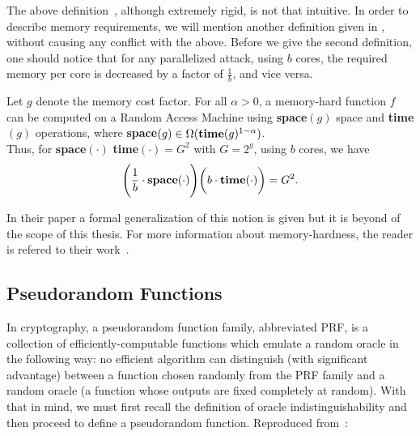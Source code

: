 The above definition~\cite{cryptoeprint:2016:875}, although extremely rigid, is not that intuitive. In order to describe memory requirements, we will mention another definition given in \cite{ForlerLW13}, without causing any conflict with the above. Before we give the second definition, one should notice that for any parallelized attack, using $b$ cores, the required memory per core is decreased by a factor of $\frac{1}{b}$, and vice versa.

\begin{definition}
  Let $g$ denote the memory cost factor. For all $\alpha > 0$, a memory-hard function $f$ can be computed on a Random Access Machine using \textbf{space}$(g)$ space and \textbf{time}$(g)$ operations, where \textbf{space}$(g) \in \Omega(\mbox{\textbf{time}}(g)^{1-\alpha})$.\\

  \noindent Thus, for \textbf{space}$(\cdot)$ \textbf{time}$(\cdot)$\:$=G^2$ with $G=2^g$, using $b$ cores, we have
  \begin{equation} \label{eqn:memhard}
    \Bigg{(} \frac{1}{b} \cdot \mbox{\textbf{space}}(\cdot) \Bigg{)} \bigg{(} b \cdot \mbox{\textbf{time}}(\cdot) \bigg{)} = G^2.
  \end{equation}
\end{definition}
In their paper a formal generalization of this notion is given but it is beyond of the scope of this thesis. For more information about memory-hardness, the reader is refered to their work~\cite{ForlerLW13}.
%
\subsection{Pseudorandom Functions} \label{sec:PRF}
In cryptography, a pseudorandom function family, abbreviated PRF, is a collection of efficiently-computable functions which emulate a random oracle in the following way: no efficient algorithm can distinguish (with significant advantage) between a function chosen randomly from the PRF family and a random oracle (a function whose outputs are fixed completely at random). With that in mind,
we must first recall the definition of oracle indistinguishability and then proceed to define a pseudorandom function. Reproduced from~\cite{ACI}:

